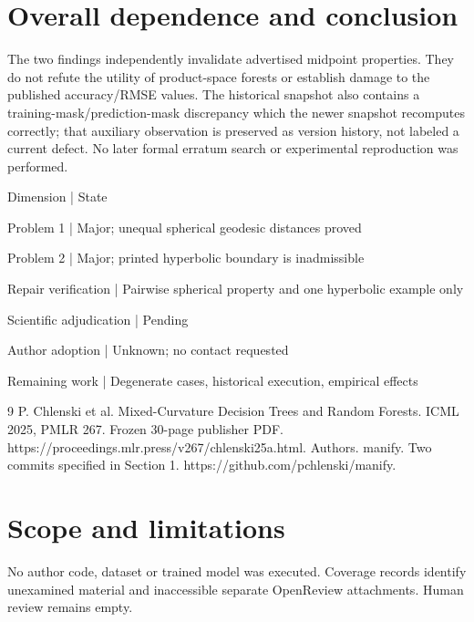 \documentclass[10pt]{article}
\begin{document}
\section*{Overall dependence and conclusion}
The two findings independently invalidate advertised midpoint properties. They do not refute the utility of product-space forests or establish damage to the published accuracy/RMSE values. The historical snapshot also contains a training-mask/prediction-mask discrepancy which the newer snapshot recomputes correctly; that auxiliary observation is preserved as version history, not labeled a current defect. No later formal erratum search or experimental reproduction was performed.\par
Dimension | State\par
Problem 1 | Major; unequal spherical geodesic distances proved\par
Problem 2 | Major; printed hyperbolic boundary is inadmissible\par
Repair verification | Pairwise spherical property and one hyperbolic example only\par
Scientific adjudication | Pending\par
Author adoption | Unknown; no contact requested\par
Remaining work | Degenerate cases, historical execution, empirical effects\par
9 P. Chlenski et al. Mixed-Curvature Decision Trees and Random Forests. ICML 2025, PMLR 267. Frozen 30-page publisher PDF. https://proceedings.mlr.press/v267/chlenski25a.html. Authors. manify. Two commits specified in Section 1. https://github.com/pchlenski/manify.\par
\section*{Scope and limitations}
No author code, dataset or trained model was executed. Coverage records identify unexamined material and inaccessible separate OpenReview attachments. Human review remains empty.\par
\end{document}
